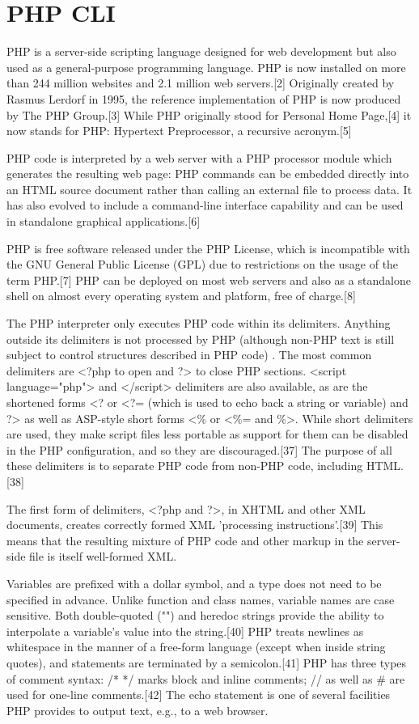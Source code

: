 \newpage
\section{PHP CLI}

PHP is a server-side scripting language designed for web development but also used as a general-purpose programming language. PHP is now installed on more than 244 million websites and 2.1 million web servers.[2] Originally created by Rasmus Lerdorf in 1995, the reference implementation of PHP is now produced by The PHP Group.[3] While PHP originally stood for Personal Home Page,[4] it now stands for PHP: Hypertext Preprocessor, a recursive acronym.[5]

\vpara
PHP code is interpreted by a web server with a PHP processor module which generates the resulting web page: PHP commands can be embedded directly into an HTML source document rather than calling an external file to process data. It has also evolved to include a command-line interface capability and can be used in standalone graphical applications.[6]

\vpara
PHP is free software released under the PHP License, which is incompatible with the GNU General Public License (GPL) due to restrictions on the usage of the term PHP.[7] PHP can be deployed on most web servers and also as a standalone shell on almost every operating system and platform, free of charge.[8]

\vpara
The PHP interpreter only executes PHP code within its delimiters. Anything outside its delimiters is not processed by PHP (although non-PHP text is still subject to control structures described in PHP code) . The most common delimiters are <?php to open and ?> to close PHP sections. <script language="php"> and </script> delimiters are also available, as are the shortened forms <? or <?= (which is used to echo back a string or variable) and ?> as well as ASP-style short forms <\% or <\%= and \%>. While short delimiters are used, they make script files less portable as support for them can be disabled in the PHP configuration, and so they are discouraged.[37] The purpose of all these delimiters is to separate PHP code from non-PHP code, including HTML.[38]

\vpara
The first form of delimiters, <?php and ?>, in XHTML and other XML documents, creates correctly formed XML 'processing instructions'.[39] This means that the resulting mixture of PHP code and other markup in the server-side file is itself well-formed XML.

\vpara
Variables are prefixed with a dollar symbol, and a type does not need to be specified in advance. Unlike function and class names, variable names are case sensitive. Both double-quoted ("") and heredoc strings provide the ability to interpolate a variable's value into the string.[40] PHP treats newlines as whitespace in the manner of a free-form language (except when inside string quotes), and statements are terminated by a semicolon.[41] PHP has three types of comment syntax: /* */ marks block and inline comments; // as well as \# are used for one-line comments.[42] The echo statement is one of several facilities PHP provides to output text, e.g., to a web browser.


